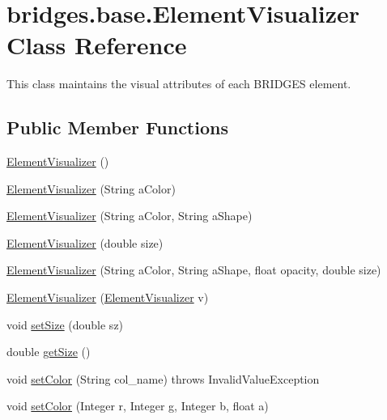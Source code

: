 \hypertarget{classbridges_1_1base_1_1_element_visualizer}{}\section{bridges.\+base.\+Element\+Visualizer Class Reference}
\label{classbridges_1_1base_1_1_element_visualizer}


This class maintains the visual attributes of each B\+R\+I\+D\+G\+E\+S element.  


\subsection*{Public Member Functions}
\begin{DoxyCompactItemize}
\item 
\hyperlink{classbridges_1_1base_1_1_element_visualizer_acbca874876ec1e8dbbde6484a4fc056e}{Element\+Visualizer} ()
\item 
\hyperlink{classbridges_1_1base_1_1_element_visualizer_a5c0d9fe8051ebc816372b9836689fdfa}{Element\+Visualizer} (String a\+Color)
\item 
\hyperlink{classbridges_1_1base_1_1_element_visualizer_ab62b1b06907fbeddfcee2b4b297e1021}{Element\+Visualizer} (String a\+Color, String a\+Shape)
\item 
\hyperlink{classbridges_1_1base_1_1_element_visualizer_ab32f66b72ccf0a26c03ba44006da9ac6}{Element\+Visualizer} (double size)
\item 
\hyperlink{classbridges_1_1base_1_1_element_visualizer_a9bf06ca1b6c215e079ab33ccd99633e8}{Element\+Visualizer} (String a\+Color, String a\+Shape, float opacity, double size)
\item 
\hyperlink{classbridges_1_1base_1_1_element_visualizer_a5b48cbda94a4e84e40de41fe156e2497}{Element\+Visualizer} (\hyperlink{classbridges_1_1base_1_1_element_visualizer}{Element\+Visualizer} v)
\item 
void \hyperlink{classbridges_1_1base_1_1_element_visualizer_aba410184f7df495594fc1fa7948335a5}{set\+Size} (double sz)
\item 
double \hyperlink{classbridges_1_1base_1_1_element_visualizer_a0b7673bf724e3df1f94df50ad95ca5b1}{get\+Size} ()
\item 
void \hyperlink{classbridges_1_1base_1_1_element_visualizer_ad7ff2a772741301c08943a58ffccca38}{set\+Color} (String col\+\_\+name)  throws Invalid\+Value\+Exception 
\item 
void \hyperlink{classbridges_1_1base_1_1_element_visualizer_a84fad1c8abe43b20c68c1800d7630918}{set\+Color} (Integer r, Integer g, Integer b, float a)

\end{DoxyCompactItemize}
